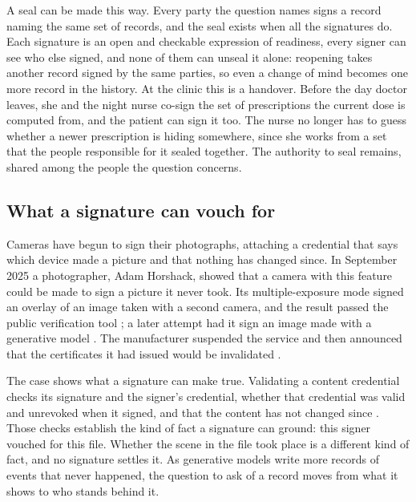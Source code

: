 A seal can be made this way. Every party the question names signs a record naming the same set of
records, and the seal exists when all the signatures do. Each signature is an open and checkable
expression of readiness, every signer can see who else signed, and none of them can unseal it alone:
reopening takes another record signed by the same parties, so even a change of mind becomes one more
record in the history. At the clinic this is a handover. Before the day doctor leaves, she and the
night nurse co-sign the set of prescriptions the current dose is computed from, and the patient can
sign it too. The nurse no longer has to guess whether a newer prescription is hiding somewhere,
since she works from a set that the people responsible for it sealed together. The authority to seal
remains, shared among the people the question concerns.

\subsection{What a signature can vouch for}\label{sec:vouch}

Cameras have begun to sign their photographs, attaching a credential that says which device made a
picture and that nothing has changed since. In September 2025 a photographer, Adam Horshack, showed
that a camera with this feature could be made to sign a picture it never took. Its multiple-exposure
mode signed an overlay of an image taken with a second camera, and the result passed the public
verification tool \citep{petapixel2025a}; a later attempt had it sign an image made with a generative
model \citep{petapixel2025c}. The manufacturer suspended the service \citep{petapixel2025b} and then
announced that the certificates it had issued would be invalidated \citep{petapixel2025c}.

The case shows what a signature can make true. Validating a content
credential checks its signature and the signer's credential, whether that credential was valid and
unrevoked when it signed, and that the content has not changed since \citep{c2pa}. Those checks establish the kind of fact a signature can ground: this signer vouched
for this file. Whether the scene in the file took place is a different kind of fact, and no signature
settles it. As generative models write more records of events that never happened, the question to
ask of a record moves from what it shows to who stands behind it.

